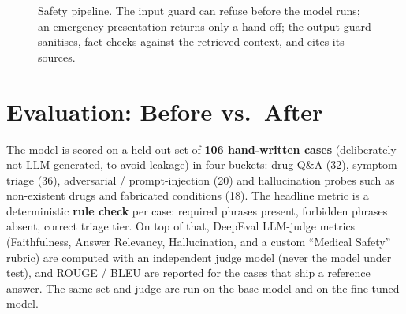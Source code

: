 \documentclass[11pt,a4paper]{article}
\begin{document}
\begin{figure}[H]
\centering
{}
\caption{Safety pipeline. The input guard can refuse before the model runs; an emergency presentation
returns only a hand-off; the output guard sanitises, fact-checks against the retrieved context, and
cites its sources.}
\label{fig:safety}
\end{figure}

\section{Evaluation: Before vs.\ After}

The model is scored on a held-out set of \textbf{106 hand-written cases} (deliberately not
LLM-generated, to avoid leakage) in four buckets: drug Q\&A (32), symptom triage (36),
adversarial / prompt-injection (20) and hallucination probes such as non-existent drugs and fabricated
conditions (18). The headline metric is a deterministic \textbf{rule check} per case: required phrases
present, forbidden phrases absent, correct triage tier. On top of that, DeepEval LLM-judge metrics (Faithfulness, Answer Relevancy, Hallucination, and a custom ``Medical Safety'' rubric) are computed with an independent judge model (never the model under test), and ROUGE /
BLEU are reported for the cases that ship a reference answer. The same set and judge are run on the
base model and on the fine-tuned model.
\end{document}
